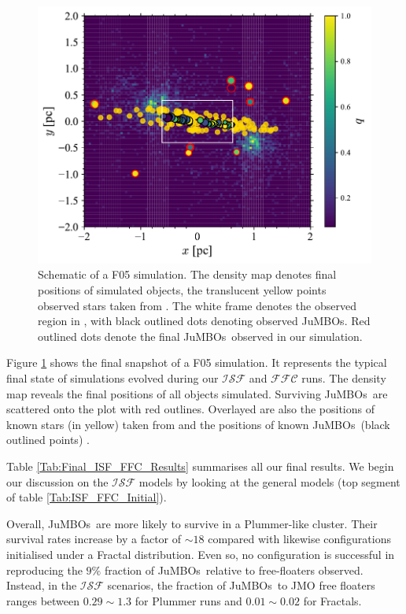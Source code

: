 \documentclass[submission,phys]{lib/SciPost}
\newcommand{\jumbos}{\mbox{JuMBOs}}
\begin{document}
   
   \begin{figure}
    \centering
        \includegraphics[width=\columnwidth]{figures/overplotting_HEATMAP.pdf}
        \caption{Schematic of a F05 simulation. The density map denotes final positions of simulated objects, the translucent yellow points observed stars taken from \cite{2016A&A...595A...1G, 2023A&A...674A...1G}. The white frame denotes the observed region in \cite{2023arXiv231001231P}, with black outlined dots denoting observed \jumbos. Red outlined dots denote the final \jumbos\, observed in our simulation.}
         \label{Fig:Overplot}
   \end{figure}

    Figure \ref{Fig:Overplot} shows the final snapshot of a F05 simulation. It represents the typical final state of simulations evolved during our $\mathcal{ISF}$ and $\mathcal{FFC}$ runs. The density map reveals the final positions of all objects simulated. Surviving \jumbos\, are scattered onto the plot with red outlines. Overlayed are also the positions of known stars (in yellow) taken from \cite{2016A&A...595A...1G, 2023A&A...674A...1G} and the positions of known \jumbos\, (black outlined points) \cite{2023arXiv231001231P}.

    Table \ref{Tab:Final_ISF_FFC_Results} summarises all our final results. We begin our discussion on the $\mathcal{ISF}$ models by looking at the general models (top segment of table \ref{Tab:ISF_FFC_Initial}). 
     
    Overall, \jumbos\, are more likely to survive in a Plummer-like cluster. Their survival rates increase by a factor of $\sim 18$ compared with likewise configurations initialised under a Fractal distribution. Even so, no configuration is successful in reproducing the $9\%$ fraction of \jumbos\, relative to free-floaters observed. Instead, in the $\mathcal{ISF}$ scenarios, the fraction of \jumbos\, to JMO free floaters ranges between $0.29\sim1.3$ for Plummer runs and $0.01\sim0.02$ for Fractals.
    
\end{document}
